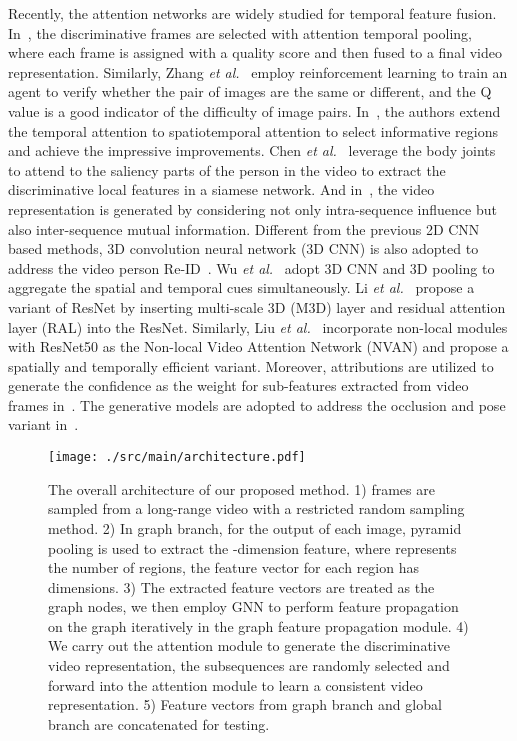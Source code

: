 \documentclass[journal]{IEEEtran}
\newcommand{\etal}{\textit{et al.}}
\let\MYoriglatexcaption\caption
\renewcommand{\caption}[2][\relax]{\MYoriglatexcaption[#2]{#2}}
\begin{document}
Recently, the attention networks are widely studied for temporal feature fusion. In~\cite{Xu_2017_ICCV,Liu_2017_CVPR}, the discriminative frames are selected with attention temporal pooling, where each frame is assigned with a quality score and then fused to a final video representation. Similarly, Zhang \etal~\cite{Zhang_2018_CVPR} employ reinforcement learning to train an agent to verify whether the pair of images are the same or different, and the Q value is a good indicator of the difficulty of image pairs. In~\cite{Li_2018_CVPR,Song_2018_AAAI,Liu_2019_AAAI,Fu_2019_AAAI}, the authors extend the temporal attention to spatiotemporal attention to select informative regions and achieve the impressive improvements. Chen \etal~\cite{Chen_2019_TIP} leverage the body joints to attend to the saliency parts of the person in the video to extract the discriminative local features in a siamese network. And in~\cite{Chen_2018_CVPR,Zhang_2019_TIP}, the video representation is generated by considering not only intra-sequence influence but also inter-sequence mutual information. Different from the previous 2D CNN based methods, 3D convolution neural network (3D CNN) is also adopted to address the video person Re-ID~\cite{Wu_2019_TNNLS,Li_2019_AAAI,Liu_2019_BMVC}. Wu \etal~\cite{Wu_2019_TNNLS} adopt 3D CNN and 3D pooling to aggregate the spatial and temporal cues simultaneously. Li \etal~\cite{Li_2019_AAAI} propose a variant of ResNet by inserting multi-scale 3D (M3D) layer and residual attention layer (RAL) into the ResNet. Similarly, Liu \etal~\cite{Liu_2019_BMVC} incorporate non-local modules with ResNet50 as the Non-local Video Attention Network (NVAN) and propose a spatially and temporally efficient variant. Moreover, attributions are utilized to generate the confidence as the weight for sub-features extracted from video frames in~\cite{Zhao_2019_CVPR}. The generative models are adopted to address the occlusion and pose variant in~\cite{Borgia_2019_WACV,Hou_2019_CVPR}.

\begin{figure*}[t]
    \begin{center}
    \texttt{[image: ./src/main/architecture.pdf]}
    \end{center}
    \caption{The overall architecture of our proposed method. 1)  frames are sampled from a long-range video with a restricted random sampling method. 2) In graph branch, for the output of each image, pyramid pooling is used to extract the -dimension feature, where  represents the number of regions, the feature vector for each region has  dimensions. 3) The extracted feature vectors are treated as the graph nodes, we then employ GNN to perform feature propagation on the graph iteratively in the graph feature propagation module. 4) We carry out the attention module to generate the discriminative video representation, the subsequences are randomly selected and forward into the attention module to learn a consistent video representation. 5) Feature vectors from graph branch and global branch are concatenated for testing.}
\label{fig:architecture}
\end{figure*}
\end{document}
